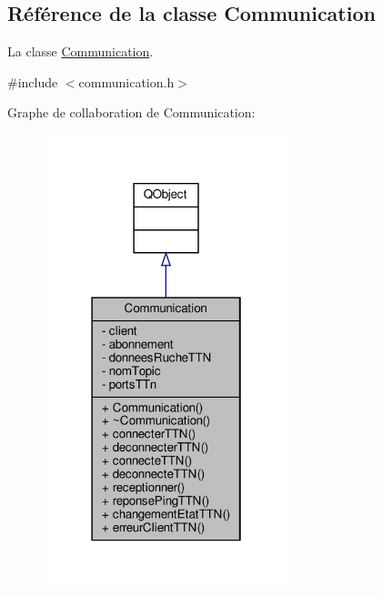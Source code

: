 \hypertarget{class_communication}{}\subsection{Référence de la classe Communication}
\label{class_communication}


La classe \hyperlink{class_communication}{Communication}.  




{\ttfamily \#include $<$communication.\+h$>$}



Graphe de collaboration de Communication\+:\nopagebreak
\begin{figure}[H]
\begin{center}
\leavevmode
\includegraphics[width=202pt]{class_communication__coll__graph}
\end{center}
\end{figure}
